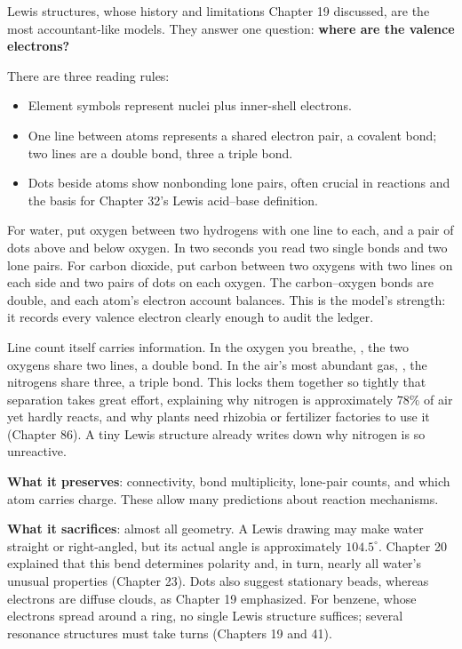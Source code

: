 Lewis structures, whose history and limitations Chapter 19 discussed, are the most accountant-like models. They answer one question: \textbf{where are the valence electrons?}

There are three reading rules:

\begin{itemize}[itemsep=2pt]
\item Element symbols represent nuclei plus inner-shell electrons.
\item One line between atoms represents a shared electron pair, a covalent bond; two lines are a double bond, three a triple bond.
\item Dots beside atoms show nonbonding lone pairs, often crucial in reactions and the basis for Chapter 32's Lewis acid--base definition.
\end{itemize}

For water, put oxygen between two hydrogens with one line to each, and a pair of dots above and below oxygen. In two seconds you read two  single bonds and two lone pairs. For carbon dioxide, put carbon between two oxygens with two lines on each side and two pairs of dots on each oxygen. The carbon--oxygen bonds are double, and each atom's electron account balances. This is the model's strength: it records every valence electron clearly enough to audit the ledger.

Line count itself carries information. In the oxygen you breathe, , the two oxygens share two lines, a double bond. In the air's most abundant gas, , the nitrogens share three, a triple bond. This locks them together so tightly that separation takes great effort, explaining why nitrogen is approximately $78\%$ of air yet hardly reacts, and why plants need rhizobia or fertilizer factories to use it (Chapter 86). A tiny Lewis structure already writes down why nitrogen is so unreactive.

\textbf{What it preserves}: connectivity, bond multiplicity, lone-pair counts, and which atom carries charge. These allow many predictions about reaction mechanisms.

\textbf{What it sacrifices}: almost all geometry. A Lewis drawing may make water straight or right-angled, but its actual  angle is approximately $104.5^{\circ}$. Chapter 20 explained that this bend determines polarity and, in turn, nearly all water's unusual properties (Chapter 23). Dots also suggest stationary beads, whereas electrons are diffuse clouds, as Chapter 19 emphasized. For benzene, whose electrons spread around a ring, no single Lewis structure suffices; several resonance structures must take turns (Chapters 19 and 41).

